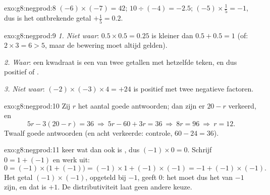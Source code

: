 \begin{solution}{exo:g8:negprod:8}
$(-6) \times (-7) = 42$; \quad
$10 \div (-4) = -2.5$; \quad
$(-5) \times \frac15 = -1$, dus is het ontbrekende getal $+\frac15 = 0.2$.
\end{solution}

\begin{solution}{exo:g8:negprod:9}
\emph{1. Niet waar}: $0.5 \times 0.5 = 0.25$ is kleiner dan
$0.5 + 0.5 = 1$ (of: $2 \times 3 = 6 > 5$, maar de bewering moet altijd gelden).

\emph{2. Waar}: een kwadraat is een  van twee getallen met hetzelfde teken, en
dus positief of .

\emph{3. Niet waar}: $(-2) \times (-3) \times 4 = +24$ is positief met twee negatieve
factoren.
\end{solution}

\begin{solution}{exo:g8:negprod:10}
Zij $r$ het aantal goede antwoorden; dan zijn er $20 - r$ verkeerd, en
\[
5r - 3(20 - r) = 36
\ \Longrightarrow\
5r - 60 + 3r = 36
\ \Longrightarrow\
8r = 96
\ \Longrightarrow\
r = 12 .
\]
Twaalf goede antwoorden (en acht verkeerde: controle,
$60 - 24 = 36$).
\end{solution}

\begin{solution}{exo:g8:negprod:11}
 keer wat dan ook is , dus $(-1) \times 0 = 0$. Schrijf $0 = 1 + (-1)$ en werk
uit:
\[
0 = (-1) \times \bigl(1 + (-1)\bigr)
= (-1) \times 1 + (-1) \times (-1)
= -1 + (-1) \times (-1).
\]
Het getal $(-1) \times (-1)$, opgeteld bij $-1$, geeft $0$: het moet dus het
 van $-1$ zijn, en dat is $+1$. De distributiviteit laat geen andere keuze.
\end{solution}

